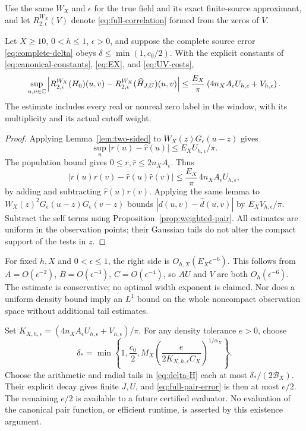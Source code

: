 Use the same $W_X$ and $\epsilon$ for the true field and its exact
finite-source approximant, and let $R_{2,\epsilon}^{W_X}(V)$ denote
\eqref{eq:full-correlation} formed from the zeros of $V$.

\begin{theorem}\label{thm:full-pair}
Let $X\ge10$, $0<h\le1$, $\epsilon>0$, and suppose the complete
source error \eqref{eq:complete-delta} obeys
$\delta\le\min(1,c_0/2)$. With the explicit constants of
\eqref{eq:canonical-constants}, \eqref{eq:EX}, and
\eqref{eq:UV-costs},
\begin{equation}\label{eq:full-pair-error}
 \sup_{u,v\in\mathbb C}
 \left|R_{2,\epsilon}^{W_X}(H_0)(u,v)
          -R_{2,\epsilon}^{W_X}(\widehat H_{J,U})(u,v)\right|
 \le\frac{E_X}{\pi}
       \left(4n_XA_\epsilon U_{h,\epsilon}+V_{h,\epsilon}\right).
\end{equation}
The estimate includes every real or nonreal zero label in the window,
with its multiplicity and its actual cutoff weight.
\end{theorem}
\begin{proof}
Applying Lemma~\ref{lem:two-sided} to
$W_X(z)G_\epsilon(u-z)$ gives
\[
 \sup_u|r(u)-\widehat r(u)|\le E_XU_{h,\epsilon}/\pi.
\]
The population bound gives $0\le r,\widehat r\le2n_XA_\epsilon$.
Thus
\[
 |r(u)r(v)-\widehat r(u)\widehat r(v)|
 \le\frac{E_X}{\pi}\,4n_XA_\epsilon U_{h,\epsilon},
\]
by adding and subtracting $\widehat r(u)r(v)$. Applying the same
lemma to $W_X(z)^2G_\epsilon(u-z)G_\epsilon(v-z)$ bounds
$|d(u,v)-\widehat d(u,v)|$ by $E_XV_{h,\epsilon}/\pi$.
Subtract the self terms using Proposition~\ref{prop:weighted-pair}.
All estimates are uniform in the observation points; their Gaussian
tails do not alter the compact support of the tests in $z$.
\end{proof}

For fixed $h,X$ and $0<\epsilon\le1$, the right side is
$O_{h,X}(E_X\epsilon^{-6})$. This follows from
$A=O(\epsilon^{-2})$, $B=O(\epsilon^{-3})$,
$C=O(\epsilon^{-4})$, so $AU$ and $V$ are both
$O_h(\epsilon^{-6})$. The estimate is conservative; no optimal
width exponent is claimed. Nor does a uniform density bound imply
an $L^1$ bound on the whole noncompact observation space without
additional tail estimates.

Set $K_{X,h,\epsilon}=(4n_XA_\epsilon U_{h,\epsilon}
+V_{h,\epsilon})/\pi$. For any density tolerance $e>0$, choose
\begin{equation}\label{eq:full-precision}
 \delta_* =\min\left\{1,\frac{c_0}{2},
 M_X\left(\frac{e}{2K_{X,h,\epsilon}C_X}\right)^{1/\alpha_X}\right\}.
\end{equation}
Choose the arithmetic and radial tails in \eqref{eq:delta-H} each
at most $\delta_*/(2\mathcal B_X)$. Their explicit decay gives finite
$J,U$, and \eqref{eq:full-pair-error} is then at most $e/2$.
The remaining $e/2$ is available to a future certified evaluator.
No evaluation of the canonical pair function, or efficient runtime,
is asserted by this existence argument.


